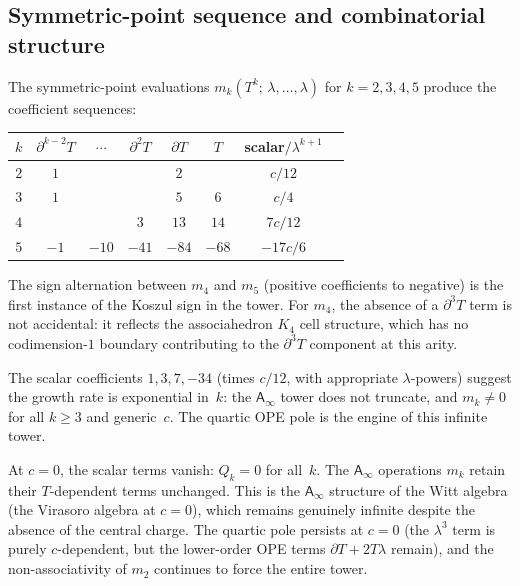 \documentclass[11pt]{article}
\newcommand{\Ainf}{\mathsf{A}_{\infty}}
\begin{document}
\subsection{Symmetric-point sequence and combinatorial structure}

The symmetric-point evaluations
$m_k(T^k;\,\lambda, \ldots, \lambda)$ for $k = 2, 3, 4, 5$
produce the coefficient sequences:
\begin{center}
\small
\renewcommand{\arraystretch}{1.3}
\begin{tabular}{@{}c*{6}{c}c@{}}
$k$
  & $\partial^{k-2}T$ & $\cdots$ & $\partial^2 T$
  & $\partial T$ & $T$ & scalar$/\lambda^{k+1}$ \\
\hline
$2$ & $1$ & & & $2$ & & $c/12$ \\
$3$ & $1$ & & & $5$ & $6$ & $c/4$ \\
$4$ & & & $3$ & $13$ & $14$ & $7c/12$ \\
$5$ & $-1$ & $-10$ & $-41$ & $-84$ & $-68$ & $-17c/6$
\end{tabular}
\end{center}

\noindent
The sign alternation between $m_4$ and $m_5$ (positive coefficients
to negative) is the first instance of the Koszul sign in the tower.
For $m_4$, the absence of a $\partial^3 T$ term is not accidental: it
reflects the associahedron $K_4$ cell structure, which has no
codimension-$1$ boundary contributing to the $\partial^3 T$ component
at this arity.

The scalar coefficients $1, 3, 7, -34$ (times $c/12$, with
appropriate $\lambda$-powers) suggest the growth rate is exponential
in~$k$: the $\Ainf$ tower does not truncate, and $m_k \neq 0$ for
all $k \geq 3$ and generic~$c$.  The quartic OPE pole is the engine
of this infinite tower.

\begin{remark}[$c = 0$: the Witt tower]
\label{rem:witt-tower-wn}
At $c = 0$, the scalar terms vanish: $Q_k = 0$ for all~$k$.
The $\Ainf$ operations $m_k$ retain their $T$-dependent terms
unchanged.  This is the $\Ainf$ structure of the Witt algebra
(the Virasoro algebra at $c = 0$), which remains genuinely
infinite despite the absence of the central charge.  The quartic
pole persists at $c = 0$ (the $\lambda^3$ term is purely
$c$-dependent, but the lower-order OPE terms $\partial T + 2T\lambda$
remain), and the non-associativity of $m_2$ continues to force the
entire tower.
\end{remark}
\end{document}
